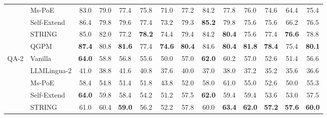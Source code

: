 \documentclass[11pt]{article}
\begin{document}
\begin{table}[t]
\begin{tabular*}{\textwidth}{@{\extracolsep{\fill}} ll cccccc @{\hspace{10pt}} cccccc @{}}
 & Ms-PoE & \phantom{0}83.0 & \phantom{0}79.0 & \phantom{0}77.4 & \phantom{0}75.8 & \phantom{0}71.0 & \phantom{0}77.2 & \phantom{0}84.2 & \phantom{0}77.8 & \phantom{0}76.0 & \phantom{0}74.6 & \phantom{0}64.4 & \phantom{0}75.4 \\
 & Self-Extend & \phantom{0}86.4 & \phantom{0}79.8 & \phantom{0}79.6 & \phantom{0}77.4 & \phantom{0}73.2 & \phantom{0}79.3 & \textbf{\phantom{0}85.2} & \phantom{0}79.8 & \phantom{0}75.6 & \phantom{0}75.6 & \phantom{0}66.2 & \phantom{0}76.5 \\
 & STRING & \phantom{0}85.0 & \phantom{0}82.0 & \phantom{0}77.2 & \textbf{\phantom{0}78.2} & \phantom{0}74.4 & \phantom{0}79.4 & \phantom{0}84.2 & \textbf{\phantom{0}80.4} & \phantom{0}75.6 & \phantom{0}77.4 & \textbf{\phantom{0}76.6} & \phantom{0}78.8 \\
 & QGPM & \textbf{\phantom{0}87.4} & \phantom{0}80.8 & \textbf{\phantom{0}81.6} & \phantom{0}77.4 & \textbf{\phantom{0}74.6} & \textbf{\phantom{0}80.4} & \phantom{0}84.6 & \textbf{\phantom{0}80.4} & \textbf{\phantom{0}81.8} & \textbf{\phantom{0}78.4} & \phantom{0}75.4 & \textbf{\phantom{0}80.1} \\
\midrule
\multirow{6}{*}{QA-2} & Vanilla & \textbf{\phantom{0}64.0} & \phantom{0}58.8 & \phantom{0}56.8 & \phantom{0}55.6 & \phantom{0}50.0 & \phantom{0}57.0 & \textbf{\phantom{0}62.0} & \phantom{0}60.2 & \phantom{0}57.0 & \phantom{0}52.6 & \phantom{0}51.4 & \phantom{0}56.6 \\
 & LLMLingua-2 & \phantom{0}41.0 & \phantom{0}38.8 & \phantom{0}41.6 & \phantom{0}40.8 & \phantom{0}37.6 & \phantom{0}40.0 & \phantom{0}37.0 & \phantom{0}38.0 & \phantom{0}37.2 & \phantom{0}35.2 & \phantom{0}35.6 & \phantom{0}36.6 \\
 & Ms-PoE & \phantom{0}58.4 & \phantom{0}54.8 & \phantom{0}51.4 & \phantom{0}51.8 & \phantom{0}43.8 & \phantom{0}52.0 & \phantom{0}58.0 & \phantom{0}61.0 & \phantom{0}55.0 & \phantom{0}52.6 & \phantom{0}50.0 & \phantom{0}55.3 \\
 & Self-Extend & \textbf{\phantom{0}64.0} & \phantom{0}59.8 & \phantom{0}58.4 & \phantom{0}54.2 & \phantom{0}51.2 & \phantom{0}57.5 & \textbf{\phantom{0}62.0} & \phantom{0}59.4 & \phantom{0}59.4 & \phantom{0}53.6 & \phantom{0}53.0 & \phantom{0}57.5 \\
 & STRING & \phantom{0}61.0 & \phantom{0}60.4 & \textbf{\phantom{0}59.0} & \phantom{0}56.2 & \phantom{0}52.2 & \phantom{0}57.8 & \phantom{0}60.0 & \textbf{\phantom{0}63.4} & \textbf{\phantom{0}62.0} & \textbf{\phantom{0}57.2} & \textbf{\phantom{0}57.6} & \textbf{\phantom{0}60.0} \\

\end{tabular*}
\end{table}
\end{document}
